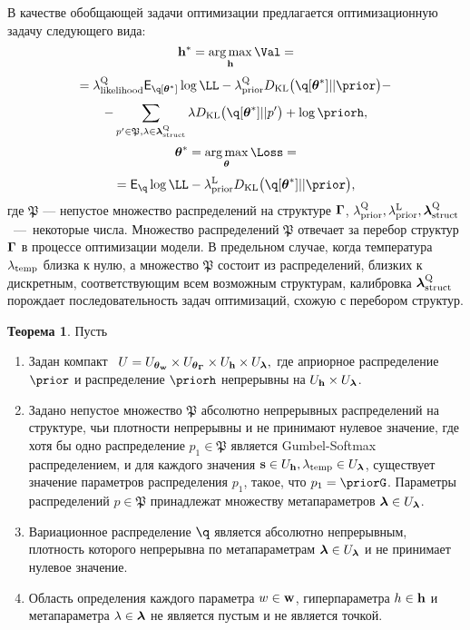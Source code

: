 \documentclass[11pt, a5paper]{dissert}
\theoremstyle{definition}
\newtheorem{theorem}{Теорема}
\DeclareMathOperator*{\argmax}{arg\,max}
\begin{document}
{В качестве обобщающей задачи оптимизации предлагается оптимизационную задачу следующего вида:
\begin{equation}
\label{eq:qopt}
\h^{*} = \argmax_{\h} \Val = 
\end{equation}
\[
= \lamLL \E_{\q[\teta^{*}]} \log\LL - \lamCQ \KL{\q[\teta^{*}]}{\prior} -
\]
\[
    - \sum_{p' \in \mathfrak{P},\lambda \in \lamS} \lambda\KL{\q[\teta^{*}]}{p'} + \log\priorh, 
\]
\begin{equation}
\label{eq:lopt}
{\teta}^{*} = \argmax_{\teta} \Loss = 
\end{equation}
\[=
\E_{\q} \log \LL - \lamCL \KL{\q[\teta^{*}]}{\prior},
\]
где $\mathfrak{P}$ --- непустое множество распределений на структуре $\boldsymbol{\Gamma}$, $\lambda_\text{prior}^\text{Q}, \lambda_\text{prior}^\text{L}, \boldsymbol{\lambda}_\text{struct}^\text{Q}$~---~некоторые числа. Множество распределений $\mathfrak{P}$ отвечает за перебор структур $\boldsymbol{\Gamma}$ в процессе оптимизации модели.
В предельном случае, когда температура $\lambda_{\text{temp}}$ близка к нулю, а множество $\mathfrak{P}$ состоит из распределений, близких к дискретным, соответствующим всем возможным структурам, калибровка $\boldsymbol{\lambda}_\text{struct}^\text{Q}$ порождает последовательность задач оптимизаций, схожую с перебором структур.

\begin{theorem}
Пусть
\begin{enumerate}%

\item Задан компакт  $U = U_{\boldsymbol{\theta}_\mathbf{w}} \times U_{\boldsymbol{\theta}_{\boldsymbol{\Gamma}}} \times U_{\mathbf{h}} \times U_{\boldsymbol{\lambda}},$ где априорное распределение $\prior$ и распределение $\priorh$ непрерывны на $U_{\mathbf{h}} \times U_{\boldsymbol{\lambda}}$.

\item Задано непустое множество  $\mathfrak{P}$ абсолютно непрерывных распределений на структуре, чьи плотности непрерывны и не принимают нулевое значение, где хотя бы одно распределение $p_1 \in \mathfrak{P}$ является Gumbel-Softmax распределением, и для каждого значения $\mathbf{s} \in U_{\mathbf{h}}, \lambda_{\text{temp}} \in U_{\boldsymbol{\lambda}}$, существует значение параметров распределения $p_1$, такое, что $p_1 = \priorG$. Параметры распределений $p \in \mathfrak{P}$ принадлежат множеству метапараметров $\boldsymbol{\lambda} \in U_{\boldsymbol{\lambda}}$.

\item Вариационное распределение $\q$ является  абсолютно непрерывным, плотность которого непрерывна по метапараметрам $\boldsymbol{\lambda} \in U_{\boldsymbol{\lambda}}$ и не принимает нулевое значение.

\item Область определения каждого параметра $w \in\mathbf{w}$, гиперпараметра $h \in \mathbf{h}$ и метапараметра $\lambda \in \boldsymbol{\lambda}$ не является пустым и не является точкой.


\end{enumerate}
\end{theorem}}
\end{document}
